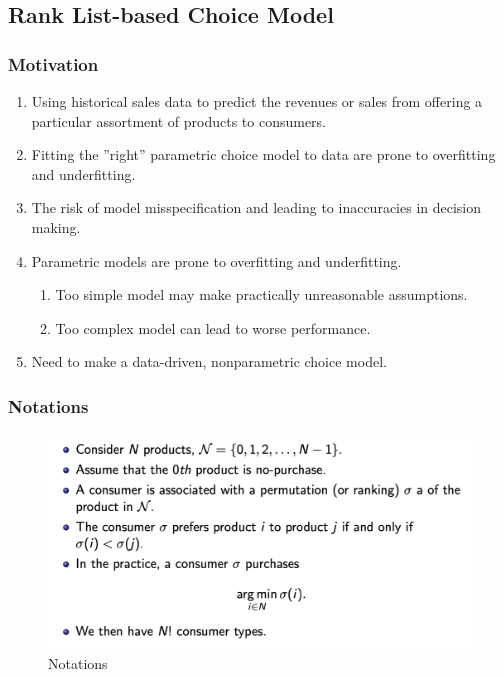 \documentclass[11pt]{elegantbook}
\begin{document}
\subsection{ Rank List-based Choice Model}
\subsubsection{ Motivation}
\begin{enumerate}[$\bullet$]
    \item Using historical sales data to predict the revenues or sales from offering a particular assortment of products to consumers.
    \item Fitting the ”right” parametric choice model to data are prone to overfitting and underfitting.
    \item The risk of model misspecification and leading to inaccuracies in decision making.
    \item Parametric models are prone to overfitting and underfitting.
    \begin{enumerate}
        \item Too simple model may make practically unreasonable assumptions.
        \item Too complex model can lead to worse performance.
    \end{enumerate}
    \item Need to make a data-driven, nonparametric choice model.
\end{enumerate}

\subsubsection{ Notations}
\begin{center}\begin{figure}[htbp]
    \centering
    \includegraphics[scale=0.5]{RLCM1.png}
    \caption{Notations}
    \label{}
\end{figure}\end{center}
\end{document}

